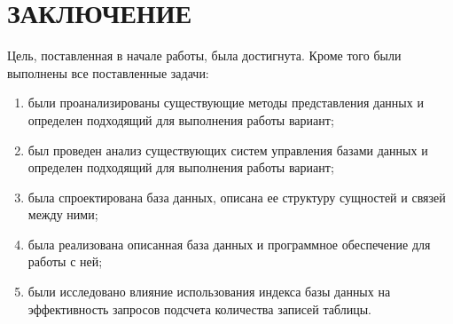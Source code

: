 \chapter*{ЗАКЛЮЧЕНИЕ}


Цель, поставленная в начале работы, была достигнута. Кроме того были выполнены все поставленные задачи:
\begin{enumerate}
	\item были проанализированы существующие методы представления данных и определен подходящий для выполнения работы вариант;
	\item был проведен анализ существующих систем управления базами данных и определен подходящий для выполнения работы вариант;
	\item была спроектирована база данных, описана ее структуру сущностей и связей между ними;
	\item была реализована описанная база данных и программное обеспечение для работы с ней;
	\item были исследовано влияние использования индекса базы данных на эффективность запросов подсчета количества записей таблицы.
\end{enumerate}

